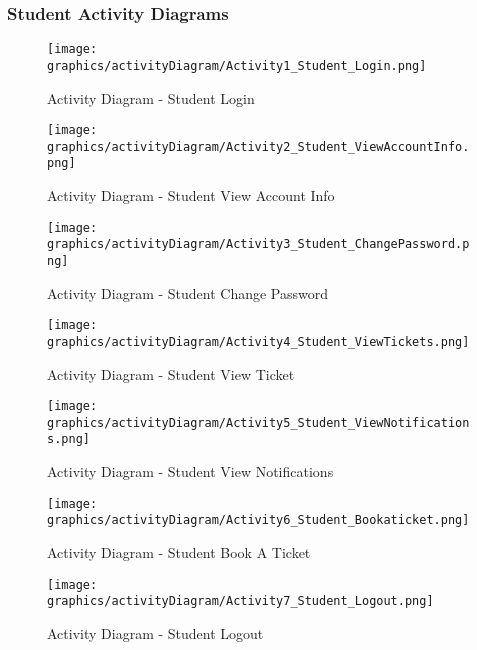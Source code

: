     \subsubsection{Student Activity Diagrams}
        \begin{figure}[H]
            \centering
            \texttt{[image: graphics/activityDiagram/Activity1\_Student\_Login.png]}
            \caption{Activity Diagram - Student Login}
        \label{fig:activitydiagram1}
        \end{figure}
        \begin{figure}[H]
            \centering
            \texttt{[image: graphics/activityDiagram/Activity2\_Student\_ViewAccountInfo.png]}
            \caption{Activity Diagram - Student View Account Info}
        \label{fig:activitydiagram2}
        \end{figure}
        \begin{figure}[H]
            \centering
            \texttt{[image: graphics/activityDiagram/Activity3\_Student\_ChangePassword.png]}
            \caption{Activity Diagram - Student Change Password}
        \label{fig:activitydiagram3}
        \end{figure}
        \begin{figure}[H]
            \centering
            \texttt{[image: graphics/activityDiagram/Activity4\_Student\_ViewTickets.png]}
            \caption{Activity Diagram - Student View Ticket}
        \label{fig:activitydiagram4}
        \end{figure}
        \begin{figure}[H]
            \centering
            \texttt{[image: graphics/activityDiagram/Activity5\_Student\_ViewNotifications.png]}
            \caption{Activity Diagram - Student View Notifications}
        \label{fig:activitydiagram5}
        \end{figure}
        \begin{figure}[H]
            \centering
            \texttt{[image: graphics/activityDiagram/Activity6\_Student\_Bookaticket.png]}
            \caption{Activity Diagram - Student Book A Ticket}
        \label{fig:activitydiagram6}
        \end{figure}
        \begin{figure}[H]
            \centering
            \texttt{[image: graphics/activityDiagram/Activity7\_Student\_Logout.png]}
            \caption{Activity Diagram - Student Logout}
        \label{fig:activitydiagram7}
        \end{figure}
    \newpage
    
